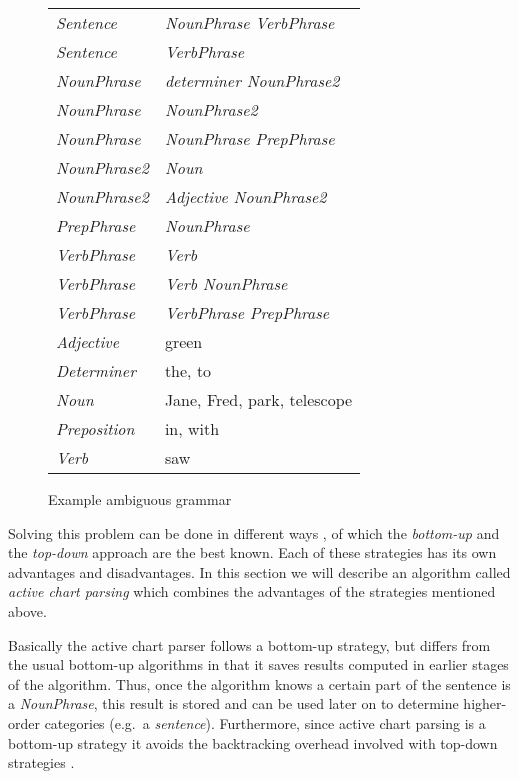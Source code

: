\footnotesize
\begin{figure}
\begin{center} 
\begin{tabular}{l@{      $\rightarrow$      }l}
{\em Sentence} & {\em NounPhrase VerbPhrase} \\
{\em Sentence} & {\em VerbPhrase} \\
{\em NounPhrase} & {\em determiner NounPhrase2} \\
{\em NounPhrase} & {\em NounPhrase2} \\
{\em NounPhrase} & {\em NounPhrase PrepPhrase} \\
{\em NounPhrase2} & {\em Noun} \\
{\em NounPhrase2} & {\em Adjective NounPhrase2} \\
{\em PrepPhrase} & {\em NounPhrase} \\
{\em VerbPhrase} & {\em Verb} \\
{\em VerbPhrase} & {\em Verb NounPhrase} \\
{\em VerbPhrase} & {\em VerbPhrase PrepPhrase} \\ [3mm]

{\em Adjective} & {\sf green} \\
{\em Determiner} & {\sf the, to} \\
{\em Noun} & {\sf Jane, Fred, park, telescope } \\
{\em Preposition} & {\sf in, with} \\
{\em Verb} & {\sf saw}
\end{tabular}
\caption{Example ambiguous grammar}
\label{grammar}
\end{center}
\end{figure}
\normalsize

Solving this problem can be done in different ways \cite {terry},
of which the {\em bottom-up} and the {\em top-down} approach are the
best known. Each of these strategies has its own advantages and
disadvantages. 
In this section we will describe an algorithm called {\em active
chart parsing} which combines the advantages of
the strategies mentioned above. 

Basically the active chart parser follows a bottom-up strategy,
but differs from the usual bottom-up algorithms in that it saves
results computed in earlier stages of the algorithm. Thus, once the
algorithm knows a certain part of the sentence is a {\em NounPhrase},
this result is stored and can be used later on to determine
higher-order categories (e.g.\ a {\em sentence}). Furthermore, since
active chart parsing is 
a bottom-up strategy it avoids the backtracking overhead involved with
top-down strategies \cite {terry}.

